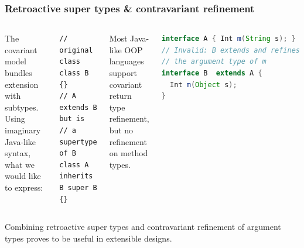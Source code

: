 \documentclass{beamer}
\begin{document}
\begin{frame}[fragile]
  \frametitle{Retroactive super types \& contravariant refinement}

\begin{columns}[t]

The covariant model bundles extension with subtypes. Using imaginary Java-like
syntax, what we would like to express:

\begin{exampleblock}{}
\begin{lstlisting}
// original class
class B {}
// A extends B but is
// a supertype of B
class A inherits B super B {}
\end{lstlisting}

\end{exampleblock}


\pause


Most Java-like OOP languages support covariant return type refinement, but no
refinement on method types.

\begin{exampleblock}{}
\begin{lstlisting}[language=java]
interface A { Int m(String s); }
// Invalid: B extends and refines
// the argument type of m
interface B  extends A {
  Int m(Object s);
}
\end{lstlisting}
\end{exampleblock}
\end{columns}

\pause

\vskip10pt

Combining retroactive super types and contravariant refinement of argument types
proves to be useful in extensible designs.

\end{frame}
\end{document}
